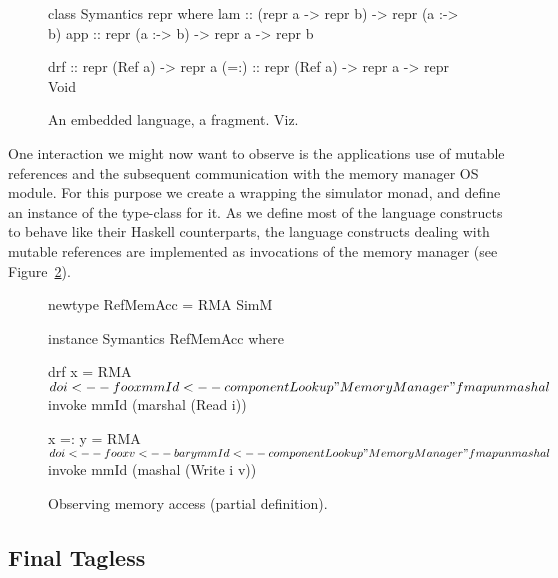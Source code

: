 \begin{figure}
\centering
\begin{code}
class Symantics repr where
  lam   :: (repr a -> repr b) -> repr (a :-> b)
  app   :: repr (a :-> b) -> repr a -> repr b

  drf   :: repr (Ref a) -> repr a
  (=:)  :: repr (Ref a) -> repr a -> repr Void
\end{code}
\caption{An embedded language, a fragment. Viz.~\cite{final_tagless_embedding}}
\label{fig:embedded_language_interface}
\end{figure}

One interaction we might now want to observe is the applications use of mutable references and the subsequent communication with the memory manager OS module.
For this purpose we create a  wrapping the simulator monad, and define an instance of the  type-class for it.
As we define most of the language constructs to behave like their Haskell counterparts, the language constructs dealing with mutable references are implemented as invocations of the memory manager (see Figure~\ref{lst_observing_memory_access}).

\begin{figure}
\centering
\begin{code}
newtype RefMemAcc =  RMA SimM

instance Symantics RefMemAcc where

  drf x = RMA $ do
    i     <-- foo x
    mmId  <-- componentLookup "MemoryManager"
    fmap unmashal $ invoke mmId (marshal (Read i))

  x =: y = RMA $ do
    i     <-- foo x
    v     <-- bar y
    mmId  <-- componentLookup "MemoryManager"
    fmap unmashal $ invoke mmId (mashal (Write i v))
\end{code}
\caption{Observing memory access (partial definition).}
\label{lst_observing_memory_access}
\end{figure}

\subsection{Final Tagless}


